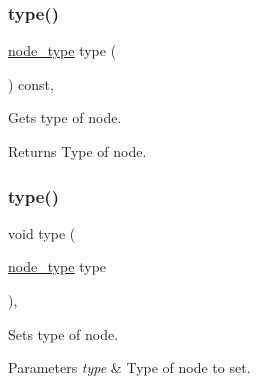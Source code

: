 \subsubsection{\texorpdfstring{type()}{type()}\hspace{0.1cm}{\footnotesize\ttfamily [1/2]}}
{\footnotesize\ttfamily \mbox{\hyperlink{namespacerapidxml_a6a276b85e2da28c5f9c3dbce61c55682}{node\+\_\+type}} type (\begin{DoxyParamCaption}{ }\end{DoxyParamCaption}) const\hspace{0.3cm}{\ttfamily [inline]}, {\ttfamily [inherited]}}



Gets type of node. 

\begin{DoxyReturn}{Returns}
Type of node. 
\end{DoxyReturn}
\mbox{\label{classrapidxml_1_1xml__node_aa78759bfa429fa2ab6bc5fe617cfa3cf}} 
\subsubsection{\texorpdfstring{type()}{type()}\hspace{0.1cm}{\footnotesize\ttfamily [2/2]}}
{\footnotesize\ttfamily void type (\begin{DoxyParamCaption}\item[{\mbox{\hyperlink{namespacerapidxml_a6a276b85e2da28c5f9c3dbce61c55682}{node\+\_\+type}}}]{type }\end{DoxyParamCaption})\hspace{0.3cm}{\ttfamily [inline]}, {\ttfamily [inherited]}}



Sets type of node. 


\begin{DoxyParams}{Parameters}
{\em type} & Type of node to set. \\
\hline
\end{DoxyParams}
\mbox{\label{classrapidxml_1_1xml__base_a558b1045e6751e4024309d41bf35c542}} 
